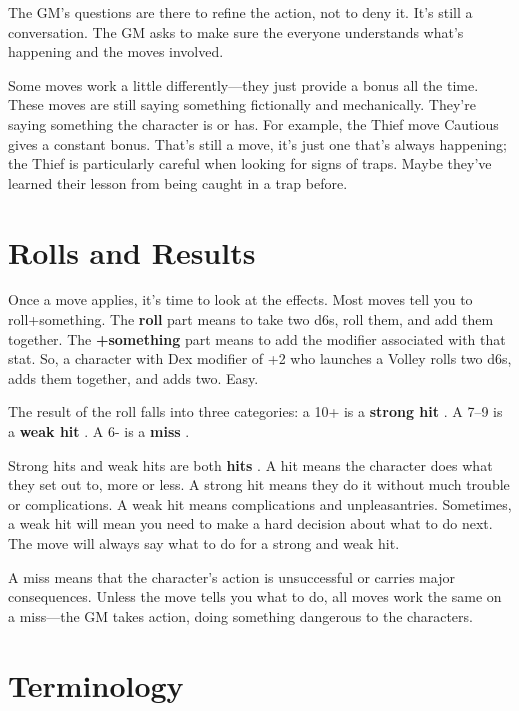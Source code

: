        

The GM's questions are there to refine the action, not to deny it. It's still a conversation. The GM asks to make sure the everyone understands what's happening and the moves involved.

       

Some moves work a little differently—they just provide a bonus all the time. These moves are still saying something fictionally and mechanically. They're saying something the character is or has. For example, the Thief move Cautious gives a constant bonus. That's still a move, it's just one that's always happening; the Thief is particularly careful when looking for signs of traps. Maybe they've learned their lesson from being caught in a trap before.

       
\section{Rolls and Results}    
       

Once a move applies, it's time to look at the effects. Most moves tell you to roll+something. The {\bf roll}  part means to take two d6s, roll them, and add them together. The {\bf +something}  part means to add the modifier associated with that stat. So, a character with Dex modifier of +2 who launches a Volley rolls two d6s, adds them together, and adds two. Easy.

       

The result of the roll falls into three categories: a 10+ is a {\bf strong hit} . A 7–9 is a {\bf weak hit} . A 6- is a {\bf miss} .

       

Strong hits and weak hits are both {\bf hits} . A hit means the character does what they set out to, more or less. A strong hit means they do it without much trouble or complications. A weak hit means complications and unpleasantries. Sometimes, a weak hit will mean you need to make a hard decision about what to do next. The move will always say what to do for a strong and weak hit.

       

A miss means that the character's action is unsuccessful or carries major consequences. Unless the move tells you what to do, all moves work the same on a miss—the GM takes action, doing something dangerous to the characters.

       
\section{Terminology}   
       

